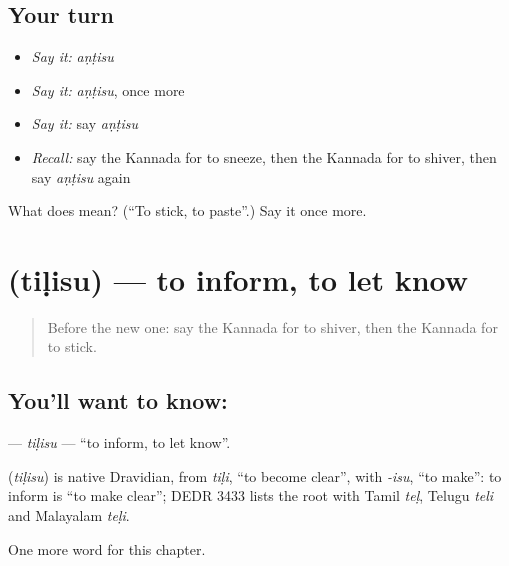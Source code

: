 \subsection*{Your turn}
\begin{itemize}
\raggedright
  \item \emph{Say it:} \emph{aṇṭisu}
  \item \emph{Say it:} \emph{aṇṭisu}, once more
  \item \emph{Say it:} say \emph{aṇṭisu}
  \item \emph{Recall:} say the Kannada for to sneeze, then the Kannada for to shiver, then say \emph{aṇṭisu} again
\end{itemize}

\begin{tcolorbox}[breakable,colback=teal!4,colframe=teal!35!black,title={Before you move on}]
What does  mean? (\textquotedblleft{}To stick, to paste\textquotedblright{}.) Say it once more.
\end{tcolorbox}
\section[\texorpdfstring{\kn{ತಿಳಿಸು} (tiḷisu)}{ತಿಳಿಸು (tiḷisu)}]{ (tiḷisu) — to inform, to let know}

\label{lesson:KA-C161-tilisu}



\begin{quote}
Before the new one: say the Kannada for to shiver, then the Kannada for to stick.
\end{quote}

\subsection*{You'll want to know: }
\textbf{} — \emph{tiḷisu} — \textquotedblleft{}to inform, to let know\textquotedblright{}.

\begin{cousinweb}
\textbf{} (\emph{tiḷisu}) is native Dravidian, from \emph{tiḷi}, \textquotedblleft{}to become clear\textquotedblright{}, with \emph{-isu}, \textquotedblleft{}to make\textquotedblright{}: to inform is \textquotedblleft{}to make clear\textquotedblright{}; DEDR 3433 lists the root with Tamil \emph{teḷ}, Telugu \emph{teli} and Malayalam \emph{teḷi}.
\end{cousinweb}

\begin{grammarlens}[title={What you've built}]
One more word for this chapter.
\end{grammarlens}

